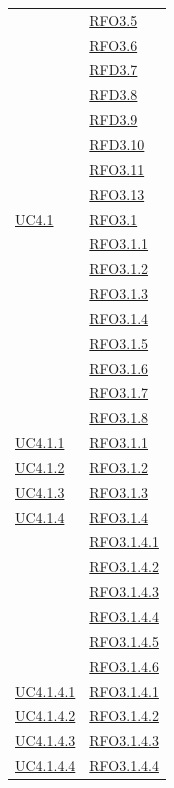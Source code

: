 \begin{itemize}
\begin{itemize}
\begin{itemize}
\begin{itemize}
\begin{longtable}{|>{\centering}m{5cm}|m{5cm}<{\centering}|}
& \hyperlink{RFO3.5}{RFO3.5}\\
& \hyperlink{RFO3.6}{RFO3.6}\\
& \hyperlink{RFD3.7}{RFD3.7}\\
& \hyperlink{RFD3.8}{RFD3.8}\\
& \hyperlink{RFD3.9}{RFD3.9}\\
& \hyperlink{RFD3.10}{RFD3.10}\\
& \hyperlink{RFO3.11}{RFO3.11}\\
& \hyperlink{RFO3.13}{RFO3.13}\\ \hline
\hyperref[UC4.1]{UC4.1} & \hyperlink{RFO3.1}{RFO3.1}\\
& \hyperlink{RFO3.1.1}{RFO3.1.1}\\
& \hyperlink{RFO3.1.2}{RFO3.1.2}\\
& \hyperlink{RFO3.1.3}{RFO3.1.3}\\
& \hyperlink{RFO3.1.4}{RFO3.1.4}\\
& \hyperlink{RFO3.1.5}{RFO3.1.5}\\
& \hyperlink{RFO3.1.6}{RFO3.1.6}\\
& \hyperlink{RFO3.1.7}{RFO3.1.7}\\
& \hyperlink{RFO3.1.8}{RFO3.1.8}\\ \hline
\hyperref[UC4.1.1]{UC4.1.1} & \hyperlink{RFO3.1.1}{RFO3.1.1}\\ \hline
\hyperref[UC4.1.2]{UC4.1.2} & \hyperlink{RFO3.1.2}{RFO3.1.2}\\ \hline
\hyperref[UC4.1.3]{UC4.1.3} & \hyperlink{RFO3.1.3}{RFO3.1.3}\\ \hline
\hyperref[UC4.1.4]{UC4.1.4} & \hyperlink{RFO3.1.4}{RFO3.1.4}\\
& \hyperlink{RFO3.1.4.1}{RFO3.1.4.1}\\
& \hyperlink{RFO3.1.4.2}{RFO3.1.4.2}\\
& \hyperlink{RFO3.1.4.3}{RFO3.1.4.3}\\
& \hyperlink{RFO3.1.4.4}{RFO3.1.4.4}\\
& \hyperlink{RFO3.1.4.5}{RFO3.1.4.5}\\
& \hyperlink{RFO3.1.4.6}{RFO3.1.4.6}\\ \hline
\hyperref[UC4.1.4.1]{UC4.1.4.1} & \hyperlink{RFO3.1.4.1}{RFO3.1.4.1}\\ \hline
\hyperref[UC4.1.4.2]{UC4.1.4.2} & \hyperlink{RFO3.1.4.2}{RFO3.1.4.2}\\ \hline
\hyperref[UC4.1.4.3]{UC4.1.4.3} & \hyperlink{RFO3.1.4.3}{RFO3.1.4.3}\\ \hline
\hyperref[UC4.1.4.4]{UC4.1.4.4} & \hyperlink{RFO3.1.4.4}{RFO3.1.4.4}\\ \hline

\end{longtable}
\end{itemize}
\end{itemize}
\end{itemize}
\end{itemize}
